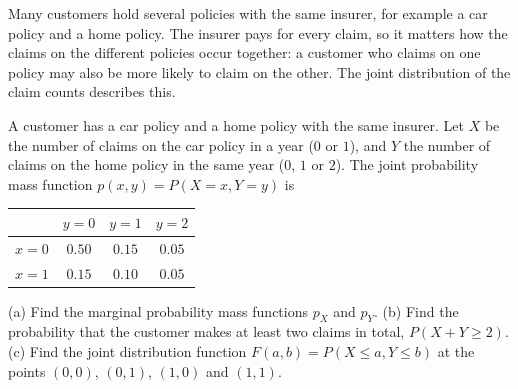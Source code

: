 
\begin{problem}
	\begin{context}
		Many customers hold several policies with the same insurer, for
		example a car policy and a home policy. The insurer pays for every
		claim, so it matters how the claims on the different policies occur
		together: a customer who claims on one policy may also be more likely
		to claim on the other. The joint distribution of the
		claim counts describes this.
	\end{context}
	A customer has a car policy and a home policy with the same insurer. Let
	$X$ be the number of claims on the car policy in a year ($0$ or $1$), and
	$Y$ the number of claims on the home policy in the same year ($0$, $1$ or
	$2$). The joint probability mass function $p(x,y)=P(X=x,Y=y)$ is
	\begin{center}
		\begin{tabular}{c|ccc}
			          & $y=0$  & $y=1$  & $y=2$  \\ \hline
			$x=0$     & $0.50$ & $0.15$ & $0.05$ \\
			$x=1$     & $0.15$ & $0.10$ & $0.05$
		\end{tabular}
	\end{center}
	(a) Find the marginal probability mass functions $p_X$ and $p_Y$.
	(b) Find the probability that the customer makes at least two claims in
	total, $P(X+Y\ge2)$.
	(c) Find the joint distribution function $F(a,b)=P(X\le a,Y\le b)$ at the
	points $(0,0)$, $(0,1)$, $(1,0)$ and $(1,1)$.
\end{problem}


